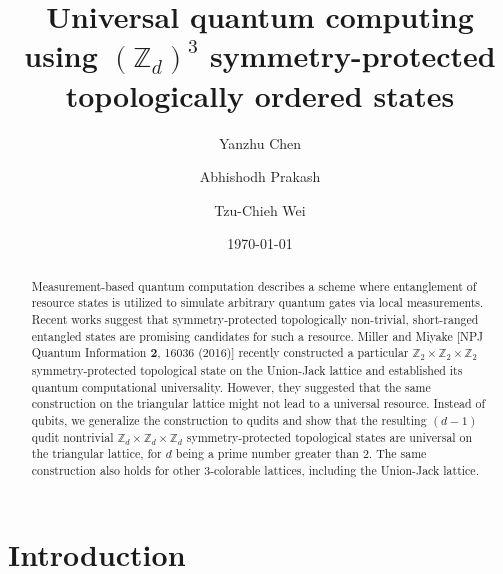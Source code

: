 \documentclass[aps,amsfonts,pra,twocolumn,showpacs]{revtex4-1}
\newcommand{\zd}{\mathbb{Z}_d}
\begin{document}
\title{Universal quantum computing using  $(\zd)^3$ symmetry-protected topologically ordered states }
\author{Yanzhu Chen}
\author{Abhishodh Prakash}
\author{Tzu-Chieh Wei}
\date{\today}

\begin{abstract}
Measurement-based quantum computation describes a scheme where entanglement of resource states is utilized to simulate arbitrary quantum gates via local measurements. Recent works suggest that symmetry-protected topologically non-trivial, short-ranged entangled states are promising candidates for such a resource. Miller and Miyake [NPJ Quantum Information \textbf{2}, 16036 (2016)] recently constructed a particular $\mathbb{Z}_2 \times \mathbb{Z}_2 \times \mathbb{Z}_2$ symmetry-protected topological state on the Union-Jack lattice and established its quantum computational universality. However, they suggested that the same construction on the triangular lattice might not lead to a universal resource. Instead of qubits, we generalize the construction to qudits and show that the resulting $(d-1)$ qudit  nontrivial $\mathbb{Z}_d \times \mathbb{Z}_d \times \mathbb{Z}_d$ symmetry-protected topological states  are universal on the triangular lattice, for $d$ being a prime number greater than 2. The same construction also holds for other 3-colorable lattices, including the Union-Jack lattice.  
\end{abstract}

\maketitle

\section{Introduction}
\end{document}
